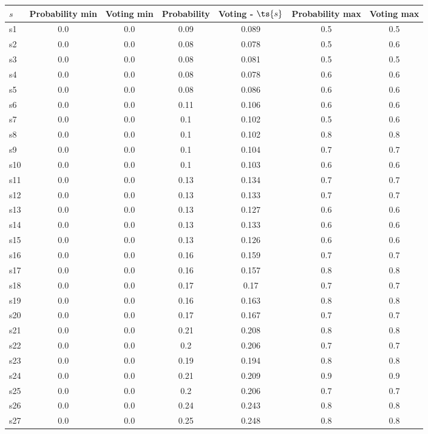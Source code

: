 \documentclass{article}
\begin{document}
\noindent\begin{tabular}{|l|c|c|c|c|c|c|}
\hline
$s$& Probability min & Voting min & Probability & Voting - $\ts{s}$ & Probability max & Voting max\\
\hline
s1 &0.0 & 0.0 & 0.09 & 0.089 & 0.5 & 0.5\\
\hline
s2 &0.0 & 0.0 & 0.08 & 0.078 & 0.5 & 0.6\\
\hline
s3 &0.0 & 0.0 & 0.08 & 0.081 & 0.5 & 0.5\\
\hline
s4 &0.0 & 0.0 & 0.08 & 0.078 & 0.6 & 0.6\\
\hline
s5 &0.0 & 0.0 & 0.08 & 0.086 & 0.6 & 0.6\\
\hline
s6 &0.0 & 0.0 & 0.11 & 0.106 & 0.6 & 0.6\\
\hline
s7 &0.0 & 0.0 & 0.1 & 0.102 & 0.5 & 0.6\\
\hline
s8 &0.0 & 0.0 & 0.1 & 0.102 & 0.8 & 0.8\\
\hline
s9 &0.0 & 0.0 & 0.1 & 0.104 & 0.7 & 0.7\\
\hline
s10 &0.0 & 0.0 & 0.1 & 0.103 & 0.6 & 0.6\\
\hline
s11 &0.0 & 0.0 & 0.13 & 0.134 & 0.7 & 0.7\\
\hline
s12 &0.0 & 0.0 & 0.13 & 0.133 & 0.7 & 0.7\\
\hline
s13 &0.0 & 0.0 & 0.13 & 0.127 & 0.6 & 0.6\\
\hline
s14 &0.0 & 0.0 & 0.13 & 0.133 & 0.6 & 0.6\\
\hline
s15 &0.0 & 0.0 & 0.13 & 0.126 & 0.6 & 0.6\\
\hline
s16 &0.0 & 0.0 & 0.16 & 0.159 & 0.7 & 0.7\\
\hline
s17 &0.0 & 0.0 & 0.16 & 0.157 & 0.8 & 0.8\\
\hline
s18 &0.0 & 0.0 & 0.17 & 0.17 & 0.7 & 0.7\\
\hline
s19 &0.0 & 0.0 & 0.16 & 0.163 & 0.8 & 0.8\\
\hline
s20 &0.0 & 0.0 & 0.17 & 0.167 & 0.7 & 0.7\\
\hline
s21 &0.0 & 0.0 & 0.21 & 0.208 & 0.8 & 0.8\\
\hline
s22 &0.0 & 0.0 & 0.2 & 0.206 & 0.7 & 0.7\\
\hline
s23 &0.0 & 0.0 & 0.19 & 0.194 & 0.8 & 0.8\\
\hline
s24 &0.0 & 0.0 & 0.21 & 0.209 & 0.9 & 0.9\\
\hline
s25 &0.0 & 0.0 & 0.2 & 0.206 & 0.7 & 0.7\\
\hline
s26 &0.0 & 0.0 & 0.24 & 0.243 & 0.8 & 0.8\\
\hline
s27 &0.0 & 0.0 & 0.25 & 0.248 & 0.8 & 0.8\\

\end{tabular}
\end{document}
